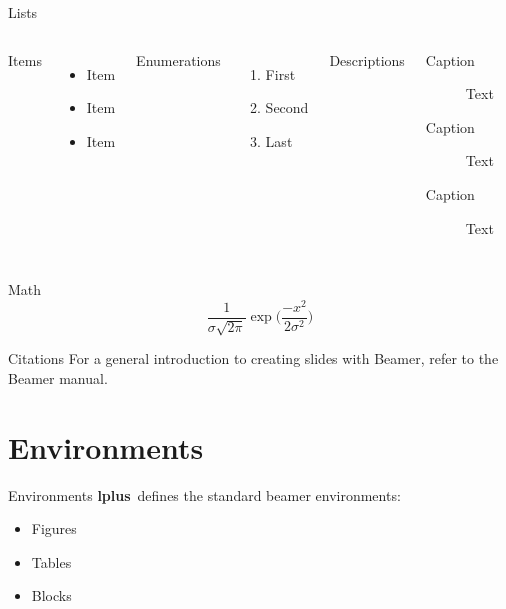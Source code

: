 \documentclass[aspectratio=169]{beamer}
\newcommand{\themename}{\textbf{lplus}~}
\begin{document}
\begin{frame}{Lists}
  \begin{columns}[T,onlytextwidth]
      Items
      \begin{itemize}
        \item Item \item Item \item Item
      \end{itemize}

      Enumerations
      \begin{enumerate}
        \item First \item Second  \item Last
      \end{enumerate}

      Descriptions
      \begin{description}
        \item[Caption] Text 
        \item[Caption] Text
        \item[Caption] Text
      \end{description}
  \end{columns}
\end{frame}

\begin{frame}{Math}
  \begin{equation*}
    \frac{1}{\sigma\sqrt{2\pi}}\exp\biggl(\frac{-x^2}{2\sigma^2}\biggr)
  \end{equation*}
\end{frame}

\begin{frame}[fragile]{Citations}
For a general introduction to creating slides with Beamer, refer to the Beamer manual.\cite{BeamerManual}
\end{frame}


\section{Environments}
\begin{frame}{Environments}
\themename defines the standard beamer environments:
\begin{itemize}
    \item Figures
    \item Tables
    \item Blocks
\end{itemize}
\end{frame}
\end{document}

